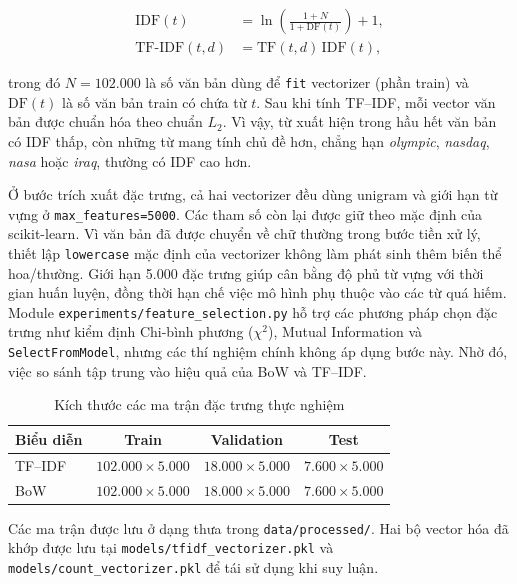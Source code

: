 \documentclass[12pt]{hcmut-report}
\begin{document}
\begin{align}
  \mathrm{IDF}(t)&=\ln\!\left(\frac{1+N}{1+\mathrm{DF}(t)}\right)+1,\label{eq:idf}\\
  \mathrm{TF\mbox{-}IDF}(t,d)&=\mathrm{TF}(t,d)\,\mathrm{IDF}(t),\label{eq:tfidf}
\end{align}

trong đó $N=102.000$ là số văn bản dùng để \texttt{fit} vectorizer (phần train) và $\mathrm{DF}(t)$ là số văn bản train có chứa từ $t$. Sau khi tính TF--IDF, mỗi vector văn bản được chuẩn hóa theo chuẩn $L_2$. Vì vậy, từ xuất hiện trong hầu hết văn bản có IDF thấp, còn những từ mang tính chủ đề hơn, chẳng hạn \textit{olympic}, \textit{nasdaq}, \textit{nasa} hoặc \textit{iraq}, thường có IDF cao hơn.

Ở bước trích xuất đặc trưng, cả hai vectorizer đều dùng unigram và giới hạn từ vựng ở \texttt{max\_features=5000}. Các tham số còn lại được giữ theo mặc định của scikit-learn. Vì văn bản đã được chuyển về chữ thường trong bước tiền xử lý, thiết lập \texttt{lowercase} mặc định của vectorizer không làm phát sinh thêm biến thể hoa/thường. Giới hạn 5.000 đặc trưng giúp cân bằng độ phủ từ vựng với thời gian huấn luyện, đồng thời hạn chế việc mô hình phụ thuộc vào các từ quá hiếm. Module \texttt{experiments/feature\_selection.py} hỗ trợ các phương pháp chọn đặc trưng như kiểm định Chi-bình phương ($\chi^2$), Mutual Information và \texttt{SelectFromModel}, nhưng các thí nghiệm chính không áp dụng bước này. Nhờ đó, việc so sánh tập trung vào hiệu quả của BoW và TF--IDF.

\begin{table}[H]
  \centering
  \caption{Kích thước các ma trận đặc trưng thực nghiệm}
  \label{tab:feature-matrices}
  \small
  \renewcommand{\arraystretch}{1.15}
  \begin{tabular}{lccc}
    \toprule
    \textbf{Biểu diễn} & \textbf{Train} & \textbf{Validation} & \textbf{Test} \\
    \midrule
    TF--IDF & $102.000\times5.000$ & $18.000\times5.000$ & $7.600\times5.000$ \\
    BoW     & $102.000\times5.000$ & $18.000\times5.000$ & $7.600\times5.000$ \\
    \bottomrule
  \end{tabular}
\end{table}

Các ma trận được lưu ở dạng thưa trong \texttt{data/processed/}. Hai bộ vector hóa đã khớp được lưu tại \texttt{models/tfidf\_vectorizer.pkl} và \texttt{models/count\_vectorizer.pkl} để tái sử dụng khi suy luận.
\end{document}
